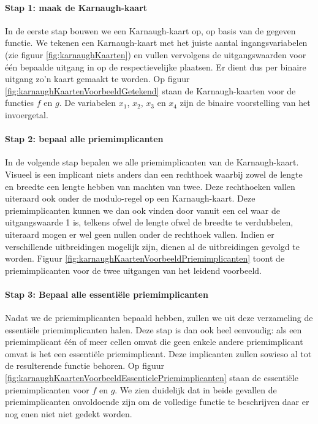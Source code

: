 \paragraph{Stap 1: maak de Karnaugh-kaart}
In de eerste stap bouwen we een Karnaugh-kaart op, op basis van de gegeven functie. We tekenen een Karnaugh-kaart met het juiste aantal ingangsvariabelen (zie figuur \ref{fig:karnaughKaarten}) en vullen vervolgens de uitgangswaarden voor \'e\'en bepaalde uitgang in op de respectievelijke plaatsen. Er dient dus per binaire uitgang zo'n kaart gemaakt te worden. Op figuur \ref{fig:karnaughKaartenVoorbeeldGetekend}
staan de Karnaugh-kaarten voor de functies $f$ en $g$. De variabelen $x_1$, $x_2$, $x_3$ en $x_4$ zijn de binaire voorstelling van het invoergetal.
\paragraph{Stap 2: bepaal alle priemimplicanten} In de volgende stap bepalen we alle priemimplicanten van de Karnaugh-kaart. Visueel is een implicant niets anders dan een rechthoek waarbij zowel de lengte en breedte een lengte hebben van machten van twee. Deze rechthoeken vallen uiteraard ook onder de modulo-regel op een Karnaugh-kaart. Deze priemimplicanten kunnen we dan ook vinden door vanuit een cel waar de uitgangswaarde 1 is, telkens ofwel de lengte ofwel de breedte te verdubbelen, uiteraard mogen er wel geen nullen onder de rechthoek vallen. Indien er verschillende uitbreidingen mogelijk zijn, dienen al de uitbreidingen gevolgd te worden. Figuur \ref{fig:karnaughKaartenVoorbeeldPriemimplicanten} toont de priemimplicanten voor de twee uitgangen van het leidend voorbeeld.
\paragraph{Stap 3: Bepaal alle essenti\"ele priemimplicanten} Nadat we de priemimplicanten bepaald hebben, zullen we uit deze verzameling de essenti\"ele priemimplicanten halen. Deze stap is dan ook heel eenvoudig: als een priemimplicant \'e\'en of meer cellen omvat die geen enkele andere priemimplicant omvat is het een essenti\"ele priemimplicant. Deze implicanten zullen sowieso al tot de resulterende functie behoren. Op figuur \ref{fig:karnaughKaartenVoorbeeldEssentielePriemimplicanten} staan de essenti\"ele priemimplicanten voor $f$ en $g$. We zien duidelijk dat in beide gevallen de priemimplicanten onvoldoende zijn om de volledige functie te beschrijven daar er nog enen niet niet gedekt worden.

